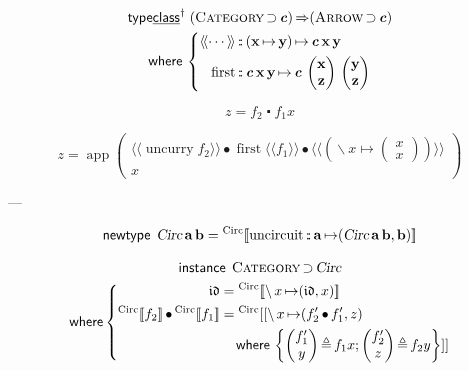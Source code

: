 \documentclass[a5paper,twoside,fleqn,draft]{jsbook}
\def\[{[\![}
\def\]{]\!]}
\newcommand{\Langle}{\langle\!\langle}
\newcommand{\Rangle}{\rangle\!\rangle}
\newcommand{\mKeyword}[1]{\mathsf{#1}}
\newcommand{\mKeywordUnderline}[1]{\text{\underline{\textsf{#1}}}}
\newcommand{\mInstanceDeclKeyword}{\mKeyword{instance}}
\newcommand{\mNewTypeDeclKeyword}{\mKeyword{newtype}}
\newcommand{\mTypeClassDeclKeyword}{\mKeyword{type}\mKeywordUnderline{class}}
\newcommand{\mWhereKeyword}{\mKeyword{where}}
\DeclareMathOperator{\mInstanceDecl}{\mInstanceDeclKeyword}
\DeclareMathOperator{\mNewTypeDecl}{\mNewTypeDeclKeyword}
\DeclareMathOperator{\mSuperClass}{\Rightarrow}
\DeclareMathOperator{\mSuperSet}{\supset}
\DeclareMathOperator{\mTypeClassDeclPolymorphic}{\mTypeClassDeclKeyword^\dagger}
\DeclareMathOperator{\mWhere}{\mWhereKeyword}
\newcommand{\mSpecialFunc}[1]{#1}
\newcommand{\mVarSpecialFunc}[1]{\mathfrak{#1}}
\DeclareMathOperator{\mIdCat}{\mVarSpecialFunc{id}}
\DeclareMathOperator{\mUncurry}{\mSpecialFunc{uncurry}}
\DeclareMathOperator{\mComp}{\centerdot}
\DeclareMathOperator{\mCompCat}{\bullet}
\DeclareMathOperator{\mFuncArrow}{\mapsto}
\DeclareMathOperator{\mIn}{{:\!:}}
\DeclareMathOperator{\mLambda}{\backslash}
\DeclareMathOperator{\mLambdaArrow}{\mapsto}
\DeclareMathOperator{\mLetEq}{\triangleq}
\newcommand{\mType}[1]{\mathbf{#1}} %
\newcommand{\mPolymorphicTypeParameter}[1]{\textbf{\textit{#1}}}
\newcommand{\mA}{\mType{a}}
\newcommand{\mB}{\mType{b}}
\newcommand{\mX}{\mType{x}}
\newcommand{\mY}{\mType{y}}
\newcommand{\mZ}{\mType{z}}
\newcommand{\mTypeConstructor}[1]{\textsl{#1}}
\newcommand{\mValueConstructor}[1]{\mathrm{#1}}
\newcommand{\mValueWith}[2]{{}^\mValueConstructor{#1}\[#2\]}
\newcommand{\mArrowWith}[1]{\Langle#1\Rangle}
\newcommand{\mPairWith}[2]{\begin{pmatrix}#1\\#2\end{pmatrix}}
\newcommand{\mTypeClass}[1]{\textsc{#1}} %
\newcommand{\mArrowTypeClass}{\mTypeClass{Arrow}}
\newcommand{\mCategoryTypeClass}{\mTypeClass{Category}}
\begin{document}
\newcommand{\mFirstFunc}{\mathop{\mathrm{first}}}

\begin{multline}
  \mTypeClassDeclPolymorphic\;
  (\mCategoryTypeClass\mSuperSet\mPolymorphicTypeParameter{c})
  \mSuperClass(\mArrowTypeClass\mSuperSet\mPolymorphicTypeParameter{c})\\
  \mWhere{}\left\{
  \begin{aligned}
    \mArrowWith{\dotsb}
    &\mIn{}(\mX\mFuncArrow\mY)\mFuncArrow\mPolymorphicTypeParameter{c}\,\mX\,\mY\\
    \mFirstFunc
    &\mIn{}\mPolymorphicTypeParameter{c}\,\mX\,\mY
    \mFuncArrow\mPolymorphicTypeParameter{c}\,\mPairWith{\mX}{\mZ}\,\mPairWith{\mY}{\mZ}
  \end{aligned}
  \right.
\end{multline}

\begin{equation}
  z=f_2\mComp f_1x
\end{equation}

\begin{equation}
  z=\mathop{\mathrm{app}}\mPairWith{\mArrowWith{\mUncurry f_2}\mCompCat\mFirstFunc\mArrowWith{f_1}\mCompCat{}\mArrowWith{\left(\mLambda x\mLambdaArrow\mPairWith{x}{x}\right)}}{x}
\end{equation}

---


\newcommand{\mUncircuit}{\mathop{\mathrm{uncircuit}}}
\newcommand{\mCircuitType}{\mTypeConstructor{Circ}}
\newcommand{\mCircuitWith}[1]{\mValueWith{Circ}{#1}}

\begin{equation}
  \mNewTypeDecl\;
  \mCircuitType\,\mA\,\mB
  =\mCircuitWith{\mUncircuit\mIn\mA\mFuncArrow(\mCircuitType\,\mA\,\mB,\mB)}
\end{equation}

\begin{multline}
  \mInstanceDecl\;
  \mTypeClass{Category}\mSuperSet\mCircuitType\\
  \mWhere
  \left\{
  \begin{aligned}
    \mIdCat
    &=\mCircuitWith{\mLambda x\mLambdaArrow(\mIdCat,x)}\\
    \mCircuitWith{f_2}\mCompCat\mCircuitWith{f_1}
    &={}^{\textrm{Circ}}[[\mLambda x\mLambdaArrow(f_2'\mCompCat f_1',z)\\
    &\quad\mWhere{}\left\{
    \mPairWith{f_1'}{y}\mLetEq f_1x;
    \mPairWith{f_2'}{z}\mLetEq f_2y\right\}]]
  \end{aligned}
  \right.
\end{multline}
\end{document}
